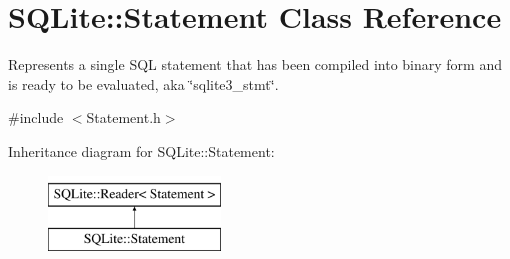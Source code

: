 \hypertarget{a00013}{\section{S\-Q\-Lite\-:\-:Statement Class Reference}
\label{a00013}
}


Represents a single S\-Q\-L statement that has been compiled into binary form and is ready to be evaluated, aka \char`\"{}sqlite3\-\_\-stmt\char`\"{}.  




{\ttfamily \#include $<$Statement.\-h$>$}

Inheritance diagram for S\-Q\-Lite\-:\-:Statement\-:\begin{figure}[H]
\begin{center}
\leavevmode
\includegraphics[height=2.000000cm]{a00013}
\end{center}
\end{figure}
